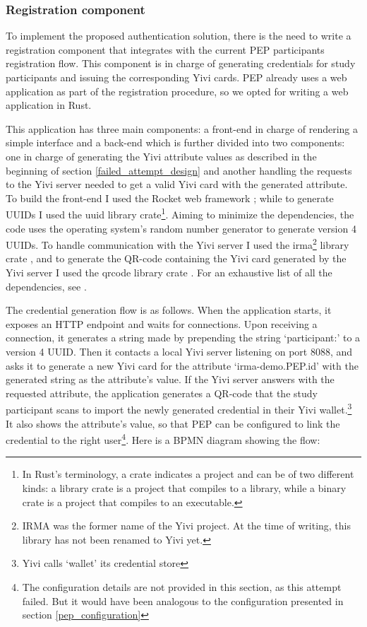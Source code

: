 \documentclass{report}
\begin{document}
\subsubsection{Registration component}\label{registration-component}
To implement the proposed authentication solution, there is the need to write a registration component that integrates with the current PEP participants registration flow. This
component is in charge of generating credentials for study participants and issuing the corresponding Yivi cards. PEP already uses a web application as part of the registration
procedure, so we opted for writing a web application in Rust. \par
This application has three main components: a front-end in charge of rendering a simple interface and a back-end which is further divided into two components: one in charge of
generating the Yivi attribute values as described in the beginning of section \ref{failed_attempt_design} and another handling the requests to the Yivi server needed to get a valid
Yivi card with the generated attribute. To build the front-end I used the Rocket web framework \cite{rocket}; while to generate UUIDs I used the uuid \cite{uuid_crate} library
crate\footnote{In Rust's terminology, a crate indicates a project and can be of two different kinds: a library crate is a project that compiles to a library, while a binary crate
is a project that compiles to an executable.}. Aiming to minimize the dependencies, the code uses the operating system's random number generator to generate version 4 UUIDs. To
handle communication with the Yivi server I used the irma\footnote{IRMA was the former name of the Yivi project. At the time of writing, this library has not been renamed to Yivi
yet.} library crate \cite{irma_crate}, and to generate the QR-code containing the Yivi card generated by the Yivi server I used the qrcode library crate \cite{qrcode_crate}. For an
exhaustive list of all the dependencies, see \cite{registration_poc_cargo_toml}. \par
The credential generation flow is as follows. When the application starts, it exposes an HTTP endpoint and waits for connections. Upon receiving a connection, it generates a string
made by prepending the string \enquote*{participant:} to a version 4 UUID. Then it contacts a local Yivi server listening on port 8088, and asks it to generate a new Yivi card for
the attribute \enquote*{irma-demo.PEP.id} with the generated string as the attribute's value. If the Yivi server answers with the requested attribute, the application generates a
QR-code that the study participant scans to import the newly generated credential in their Yivi wallet.\footnote{Yivi calls \enquote*{wallet} its credential store} It also shows
the attribute's value, so that PEP can be configured to link the credential to the right user\footnote{The configuration details are not provided in this section, as this attempt
failed. But it would have been analogous to the configuration presented in section \ref{pep_configuration}}. Here is a BPMN diagram showing the flow:
\end{document}
